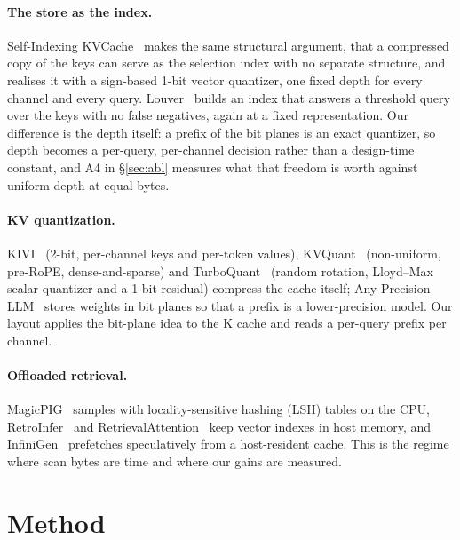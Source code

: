 \documentclass[10pt,twocolumn]{article}
\begin{document}
\paragraph{The store as the index.} Self-Indexing KVCache~\cite{selfindex} makes the same structural argument, that a compressed copy of the keys can serve as the selection index with no separate structure, and realises it with a sign-based 1-bit vector quantizer, one fixed depth for every channel and every query. Louver~\cite{louver} builds an index that answers a threshold query over the keys with no false negatives, again at a fixed representation. Our difference is the depth itself: a prefix of the bit planes is an exact quantizer, so depth becomes a per-query, per-channel decision rather than a design-time constant, and A4 in \S\ref{sec:abl} measures what that freedom is worth against uniform depth at equal bytes.

\paragraph{KV quantization.} KIVI~\cite{kivi} (2-bit, per-channel keys and per-token values), KVQuant~\cite{kvquant} (non-uniform, pre-RoPE, dense-and-sparse) and TurboQuant~\cite{turboquant} (random rotation, Lloyd--Max scalar quantizer and a 1-bit residual) compress the cache itself; Any-Precision LLM~\cite{anyprecision} stores weights in bit planes so that a prefix is a lower-precision model. Our layout applies the bit-plane idea to the K cache and reads a per-query prefix per channel.

\paragraph{Offloaded retrieval.} MagicPIG~\cite{magicpig} samples with locality-sensitive hashing (LSH) tables on the CPU, RetroInfer~\cite{retroinfer} and RetrievalAttention~\cite{retrievalattention} keep vector indexes in host memory, and InfiniGen~\cite{infinigen} prefetches speculatively from a host-resident cache. This is the regime where scan bytes are time and where our gains are measured.

\section{Method}\label{sec:method}
\end{document}
